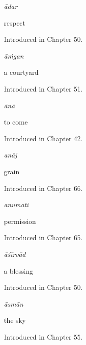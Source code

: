 \noindent\begin{minipage}[t]{\linewidth}
\raggedright
\textbf{}\enspace\emph{ādar}\par
\small respect\par
\footnotesize Introduced in Chapter 50.
\end{minipage}\par\medskip

\noindent\begin{minipage}[t]{\linewidth}
\raggedright
\textbf{}\enspace\emph{āṁgan}\par
\small a courtyard\par
\footnotesize Introduced in Chapter 51.
\end{minipage}\par\medskip

\noindent\begin{minipage}[t]{\linewidth}
\raggedright
\textbf{}\enspace\emph{ānā}\par
\small to come\par
\footnotesize Introduced in Chapter 42.
\end{minipage}\par\medskip

\noindent\begin{minipage}[t]{\linewidth}
\raggedright
\textbf{}\enspace\emph{anāj}\par
\small grain\par
\footnotesize Introduced in Chapter 66.
\end{minipage}\par\medskip

\noindent\begin{minipage}[t]{\linewidth}
\raggedright
\textbf{}\enspace\emph{anumati}\par
\small permission\par
\footnotesize Introduced in Chapter 65.
\end{minipage}\par\medskip

\noindent\begin{minipage}[t]{\linewidth}
\raggedright
\textbf{}\enspace\emph{āśīrvād}\par
\small a blessing\par
\footnotesize Introduced in Chapter 50.
\end{minipage}\par\medskip

\noindent\begin{minipage}[t]{\linewidth}
\raggedright
\textbf{}\enspace\emph{āsmān}\par
\small the sky\par
\footnotesize Introduced in Chapter 55.
\end{minipage}\par\medskip


